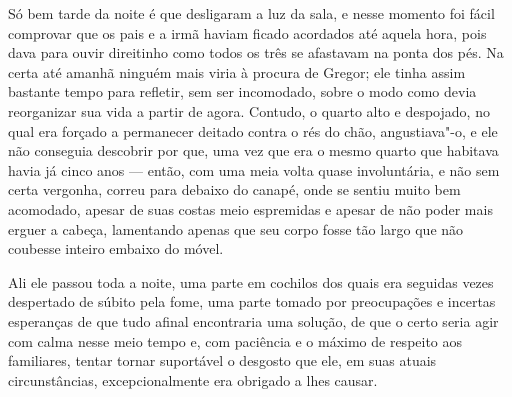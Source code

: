 Só bem tarde da noite é que desligaram a luz da sala, e nesse momento foi
fácil comprovar que os pais e a irmã haviam ficado acordados até aquela
hora, pois dava para ouvir direitinho como todos os três se afastavam na
ponta dos pés. Na certa até amanhã ninguém mais viria à procura de Gregor;
ele tinha assim bastante tempo para refletir, sem ser incomodado, sobre o
modo como devia reorganizar sua vida a partir de agora. Contudo, o quarto
alto e despojado, no qual era forçado a permanecer deitado contra o rés do
chão, angustiava"-o, e ele não conseguia descobrir por que, uma vez que era
o mesmo quarto que habitava havia já cinco anos --- então, com uma meia
volta quase involuntária, e não sem certa vergonha, correu para debaixo do
canapé, onde se sentiu muito bem acomodado, apesar de suas costas meio
espremidas e apesar de não poder mais erguer a cabeça, lamentando apenas
que seu corpo fosse tão largo que não coubesse inteiro embaixo do móvel.

Ali ele passou toda a noite, uma parte em cochilos dos quais era seguidas
vezes despertado de súbito pela fome, uma parte tomado por preocupações
e incertas esperanças de que tudo afinal encontraria uma solução, de que o
certo seria agir com calma nesse meio tempo e, com paciência e o máximo de
respeito aos familiares, tentar tornar suportável o desgosto que ele, em
suas atuais circunstâncias, excepcionalmente era obrigado a lhes causar.

